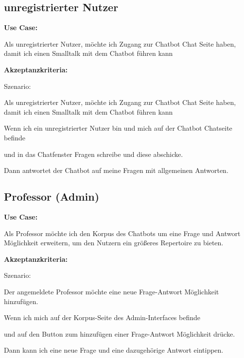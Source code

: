 \newpage
\subsection{unregistrierter Nutzer}

\textbf{Use Case:}
\newline

\noindent Als unregistrierter Nutzer,
möchte ich Zugang zur Chatbot Chat Seite haben,
damit ich einen Smalltalk mit dem Chatbot führen kann
\newline

\noindent \textbf{Akzeptanzkriteria:}
\newline

\noindent Szenario: 

\noindent Als unregistrierter Nutzer,
möchte ich Zugang zur Chatbot Chat Seite haben,
damit ich einen Smalltalk mit dem Chatbot führen kann
\newline

\noindent Wenn ich ein unregistrierter Nutzer bin und mich auf der Chatbot Chatseite befinde

\noindent und in das Chatfenster Fragen schreibe und diese abschicke.

\noindent Dann antwortet der Chatbot auf meine Fragen mit allgemeinen Antworten.

\subsection{Professor (Admin)}

\textbf{Use Case:}
\newline

\noindent Als Professor möchte ich den Korpus des Chatbots 
um eine Frage und Antwort Möglichkeit erweitern, 
um den Nutzern ein größeres Repertoire zu bieten.
\newline

\noindent \textbf{Akzeptanzkriteria:}
\newline

\noindent Szenario: 

\noindent Der angemeldete Professor möchte eine neue Frage-Antwort Möglichkeit hinzufügen.
\newline

\noindent Wenn ich mich auf der Korpus-Seite des Admin-Interfaces befinde

\noindent und auf den Button zum hinzufügen einer Frage-Antwort Möglichkeit drücke.

\noindent Dann kann ich eine neue Frage und eine dazugehörige Antwort eintippen.




